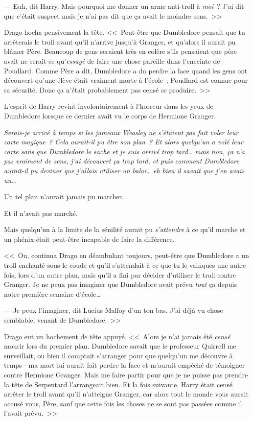--- Euh, dit Harry. Mais pourquoi me donner un arme anti-troll à \emph{moi}~? J'ai dit que c'était suspect mais je n'ai pas dit que ça avait le moindre sens.~>>

Drago hocha pensivement la tête. <<~Peut-être que Dumbledore pensait que tu arrêterais le troll avant qu'il n'arrive jusqu'à Granger, et qu'alors il aurait pu blâmer Père. Beaucoup de gens seraient très en colère s'ils pensaient que père avait ne serait-ce qu'\emph{essayé} de faire une chose pareille dans l'enceinte de Poudlard. Comme Père a dit, Dumbledore a du perdre la face quand les gens ont découvert qu'une élève était vraiment morte à l'école~; Poudlard est connue pour sa sécurité. Donc ça n'était probablement pas censé se produire.~>>

L'esprit de Harry revint involontairement à l'horreur dans les yeux de Dumbledore lorsque ce dernier avait vu le corps de Hermione Granger.

\emph{Serais-je arrivé à temps si les jumeaux Weasley ne s'étaient pas fait voler leur carte magique~? Cela aurait-il pu être son plan~? Et alors quelqu'un a volé leur carte sans que Dumbledore le sache et je suis arrivé trop tard… mais non, ça n'a pas vraiment de sens, j'ai découvert ça trop tard, et puis comment Dumbledore aurait-il pu deviner que j'allais utiliser un balai… eh bien il savait que j'en avais un…}

Un tel plan n'aurait jamais pu marcher.

Et il n'avait pas marché.

Mais quelqu'un à la limite de la sénilité aurait pu \emph{s'attendre} à ce qu'il marche et un phénix était peut-être incapable de faire la différence.

<<~Ou, continua Drago en déambulant toujours, peut-être que Dumbledore a un troll enchanté sous le coude et qu'il s'attendait à ce que tu le vainques une autre fois, lors d'un autre plan, mais qu'il a fini par décider d'utiliser le troll contre Granger. Je ne peux pas imaginer que Dumbledore avait prévu \emph{tout} ça depuis notre première semaine d'école…

--- Je peux l'imaginer, dit Lucius Malfoy d'un ton bas. J'ai déjà vu chose semblable, venant de Dumbledore.~>>

Drago eut un hochement de tête appuyé. <<~Alors je n'ai jamais été \emph{censé} mourir lors du premier plan. Dumbledore savait que le professeur Quirrell me surveillait, ou bien il comptait s'arranger pour que quelqu'un me découvre à temps - ma mort lui aurait fait perdre la face et m'aurait empêché de témoigner contre Hermione Granger. Mais me faire partir pour que je ne puisse pas prendre la tête de Serpentard l'arrangeait bien. Et la fois suivante, Harry était censé arrêter le troll avant qu'il n'atteigne Granger, car alors tout le monde vous aurait accusé vous, Père, sauf que cette fois les choses ne se sont pas passées comme il l'avait prévu.~>>

